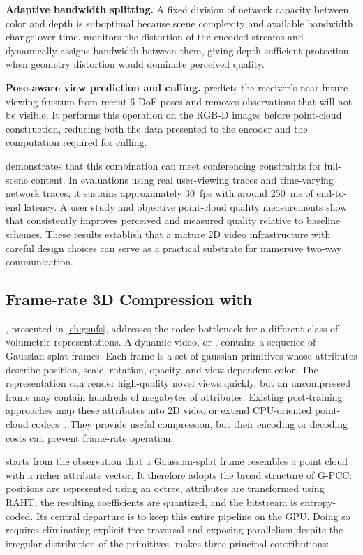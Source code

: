     \item \textbf{Adaptive bandwidth splitting.} A fixed division of network capacity between color and depth is suboptimal because scene complexity and available bandwidth change over time. \livo monitors the distortion of the encoded streams and dynamically assigns bandwidth between them, giving depth sufficient protection when geometry distortion would dominate perceived quality.

    \item \textbf{Pose-aware view prediction and culling.} \livo predicts the receiver's near-future viewing frustum from recent 6-DoF poses and removes observations that will not be visible. It performs this operation on the RGB-D images before point-cloud construction, reducing both the data presented to the encoder and the computation required for culling.
\squishend

\livo demonstrates that this combination can meet conferencing constraints for full-scene content. 
%
In evaluations using real user-viewing traces and time-varying network traces, it sustains approximately 30~fps with around 250~ms of end-to-end latency. 
%
A user study and objective point-cloud quality measurements show that \livo consistently improves perceived and measured quality relative to baseline schemes. 
%
These results establish that a mature 2D video infrastructure with careful design choices can serve as a practical substrate for immersive two-way communication.

\subsection{Frame-rate 3D Compression with \gsnfs}
\label{sec:intro_v2_gsnfs}

\gsnfs, presented in \cref{ch:gsnfs}, addresses the codec bottleneck for a different class of volumetric representations. 
%
A dynamic \gs video, or \dgs, contains a sequence of Gaussian-splat frames. 
%
Each frame is a set of gaussian primitives whose attributes describe position, scale, rotation, opacity, and view-dependent color. 
%
The representation can render high-quality novel views quickly, but an uncompressed frame may contain hundreds of megabytes of attributes.
%
Existing post-training approaches map these attributes into 2D video or extend CPU-oriented point-cloud codecs~\cite{v3volumetric,mesongs,LTS,gpcc}. They provide useful compression, but their encoding or decoding costs can prevent frame-rate operation.

\gsnfs starts from the observation that a Gaussian-splat frame resembles a point cloud
with a richer attribute vector. 
%
It therefore adopts the broad structure of G-PCC: positions are represented using an octree, attributes are transformed using RAHT, the resulting coefficients are quantized, and the bitstream is entropy-coded. 
%
Its central departure is to keep this entire pipeline on the GPU. 
%
Doing so requires eliminating explicit tree traversal and exposing parallelism despite the irregular distribution of the primitives.
%
\gsnfs makes three principal contributions:

